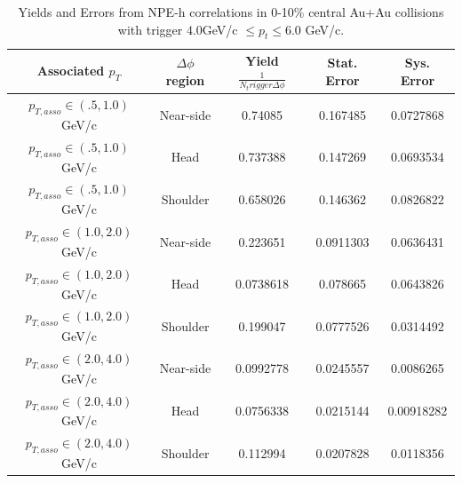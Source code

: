 \begin{table}
\centering
\begin{tabular}{|c|c|c|c|c|}
\hline
Associated $p_T$	& $\Delta\phi$ region & Yield $\frac{1}{N_trigger \Delta\phi}$ & Stat. Error & Sys. Error\\
\hline
$p_{T,asso} \in(.5, 1.0)$ GeV/c  & Near-side & 0.74085 & 0.167485 & 0.0727868 \\
\hline
$p_{T,asso} \in(.5, 1.0)$ GeV/c  & Head & 0.737388 & 0.147269 & 0.0693534 \\
\hline
$p_{T,asso} \in(.5, 1.0)$ GeV/c  & Shoulder & 0.658026 & 0.146362 & 0.0826822 \\
\hline
$p_{T,asso} \in(1.0, 2.0)$ GeV/c  & Near-side & 0.223651 & 0.0911303 & 0.0636431 \\
\hline
$p_{T,asso} \in(1.0, 2.0)$ GeV/c  & Head & 0.0738618 & 0.078665 & 0.0643826 \\
\hline
$p_{T,asso} \in(1.0, 2.0)$ GeV/c  & Shoulder & 0.199047 & 0.0777526 & 0.0314492 \\
\hline
$p_{T,asso} \in(2.0, 4.0)$ GeV/c  & Near-side & 0.0992778 & 0.0245557 & 0.0086265 \\
\hline
$p_{T,asso} \in(2.0, 4.0)$ GeV/c  & Head & 0.0756338 & 0.0215144 & 0.00918282 \\
\hline
$p_{T,asso} \in(2.0, 4.0)$ GeV/c  & Shoulder & 0.112994 & 0.0207828 & 0.0118356 \\
\hline
\end{tabular}
\caption[Yields and Errors in Au+Au Correlations, 0-10\%, Low Trigger]{Yields and Errors from NPE-h correlations in 0-10\% central Au+Au collisions with trigger $4.0 $GeV/c $\leq p_t \leq 6.0$ GeV/c.}
\label{tab:AuAuYieldCentLow}
\end{table} 


